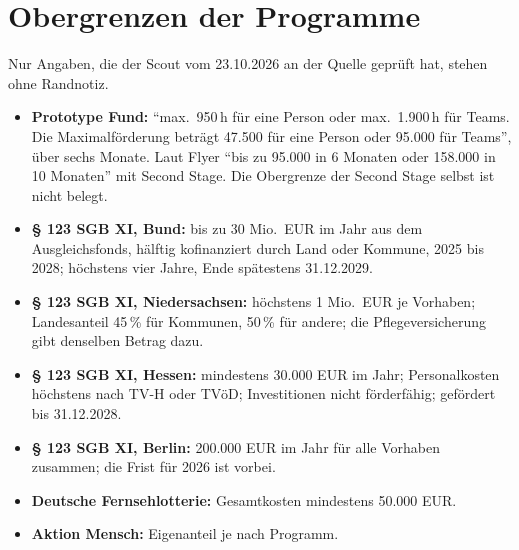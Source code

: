 \documentclass[11pt,a4paper,parskip=half-]{scrartcl}
\begin{document}
\section*{Obergrenzen der Programme}
Nur Angaben, die der Scout vom 23.10.2026 an der Quelle geprüft hat, stehen ohne Randnotiz.
\begin{itemize}
  \item \textbf{Prototype Fund:} \enquote{max.\ 950\,h für eine Person oder max.\ 1.900\,h für Teams.
        Die Maximalförderung beträgt 47.500 für eine Person oder 95.000 für Teams}, über sechs Monate.
        Laut Flyer \enquote{bis zu 95.000 in 6 Monaten oder 158.000 in 10 Monaten} mit Second Stage.
        Die Obergrenze der Second Stage selbst ist nicht belegt.%
  \item \textbf{§ 123 SGB XI, Bund:} bis zu 30 Mio.\ EUR im Jahr aus dem Ausgleichsfonds, hälftig
        kofinanziert durch Land oder Kommune, 2025 bis 2028; höchstens vier Jahre, Ende spätestens
        31.12.2029.
  \item \textbf{§ 123 SGB XI, Niedersachsen:} höchstens 1 Mio.\ EUR je Vorhaben; Landesanteil
        45\,\% für Kommunen, 50\,\% für andere; die Pflegeversicherung gibt denselben Betrag dazu.
  \item \textbf{§ 123 SGB XI, Hessen:} mindestens 30.000 EUR im Jahr; Personalkosten höchstens nach
        TV-H oder TVöD; Investitionen nicht förderfähig; gefördert bis 31.12.2028.
  \item \textbf{§ 123 SGB XI, Berlin:} 200.000 EUR im Jahr für alle Vorhaben zusammen; die Frist
        für 2026 ist vorbei.
  \item \textbf{Deutsche Fernsehlotterie:} Gesamtkosten mindestens 50.000 EUR.
  \item \textbf{Aktion Mensch:} Eigenanteil je nach Programm.
\end{itemize}
\end{document}
